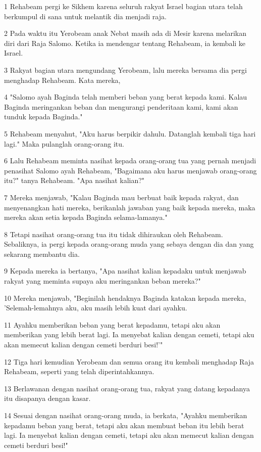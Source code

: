\par 1 Rehabeam pergi ke Sikhem karena seluruh rakyat Israel bagian utara telah berkumpul di sana untuk melantik dia menjadi raja.
\par 2 Pada waktu itu Yerobeam anak Nebat masih ada di Mesir karena melarikan diri dari Raja Salomo. Ketika ia mendengar tentang Rehabeam, ia kembali ke Israel.
\par 3 Rakyat bagian utara mengundang Yerobeam, lalu mereka bersama dia pergi menghadap Rehabeam. Kata mereka,
\par 4 "Salomo ayah Baginda telah memberi beban yang berat kepada kami. Kalau Baginda meringankan beban dan mengurangi penderitaan kami, kami akan tunduk kepada Baginda."
\par 5 Rehabeam menyahut, "Aku harus berpikir dahulu. Datanglah kembali tiga hari lagi." Maka pulanglah orang-orang itu.
\par 6 Lalu Rehabeam meminta nasihat kepada orang-orang tua yang pernah menjadi penasihat Salomo ayah Rehabeam, "Bagaimana aku harus menjawab orang-orang itu?" tanya Rehabeam. "Apa nasihat kalian?"
\par 7 Mereka menjawab, "Kalau Baginda mau berbuat baik kepada rakyat, dan menyenangkan hati mereka, berikanlah jawaban yang baik kepada mereka, maka mereka akan setia kepada Baginda selama-lamanya."
\par 8 Tetapi nasihat orang-orang tua itu tidak dihiraukan oleh Rehabeam. Sebaliknya, ia pergi kepada orang-orang muda yang sebaya dengan dia dan yang sekarang membantu dia.
\par 9 Kepada mereka ia bertanya, "Apa nasihat kalian kepadaku untuk menjawab rakyat yang meminta supaya aku meringankan beban mereka?"
\par 10 Mereka menjawab, "Beginilah hendaknya Baginda katakan kepada mereka, 'Selemah-lemahnya aku, aku masih lebih kuat dari ayahku.
\par 11 Ayahku memberikan beban yang berat kepadamu, tetapi aku akan memberikan yang lebih berat lagi. Ia menyebat kalian dengan cemeti, tetapi aku akan memecut kalian dengan cemeti berduri besi!'"
\par 12 Tiga hari kemudian Yerobeam dan semua orang itu kembali menghadap Raja Rehabeam, seperti yang telah diperintahkannya.
\par 13 Berlawanan dengan nasihat orang-orang tua, rakyat yang datang kepadanya itu disapanya dengan kasar.
\par 14 Sesuai dengan nasihat orang-orang muda, ia berkata, "Ayahku memberikan kepadamu beban yang berat, tetapi aku akan membuat beban itu lebih berat lagi. Ia menyebat kalian dengan cemeti, tetapi aku akan memecut kalian dengan cemeti berduri besi!"
